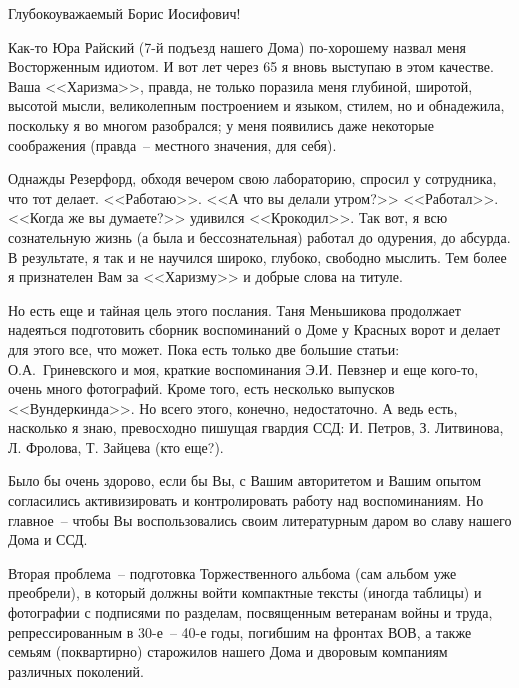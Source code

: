 \documentclass[utf8x, 12pt]{G7-32a} %
\begin{document}
\frontmatter %


\thispagestyle{empty} 

\begin{center}
    Глубокоуважаемый Борис Иосифович!
\end{center}

Как-то Юра Райский (7-й подъезд нашего Дома) по-хорошему назвал меня Восторженным идиотом. И вот лет через 65 я вновь выступаю в этом качестве. Ваша <<Харизма>>, правда, не только поразила меня глубиной, широтой, высотой мысли, великолепным построением и языком, стилем, но и обнадежила, поскольку я во многом разобрался; у меня появились даже некоторые соображения (правда~-- местного значения, для себя).

Однажды Резерфорд, обходя вечером свою лабораторию, спросил у сотрудника, что тот делает. <<Работаю>>. <<А что вы делали утром?>> <<Работал>>. <<Когда же вы думаете?>> удивился <<Крокодил>>. Так вот, я всю сознательную жизнь (а была и бессознательная) работал до одурения, до абсурда. В результате, я так и не научился широко, глубоко, свободно мыслить. Тем более я признателен Вам за <<Харизму>> и добрые слова на титуле.

Но есть еще и тайная цель этого послания. Таня Меньшикова продолжает надеяться подготовить сборник воспоминаний о Доме у Красных ворот и делает для этого все, что может. Пока есть только две большие статьи: О.А.~Гриневского и моя, краткие воспоминания Э.И. Певзнер и еще кого-то, очень много фотографий. Кроме того, есть несколько выпусков <<Вундеркинда>>. Но всего этого, конечно, недостаточно. А ведь есть, насколько я знаю, превосходно пишущая гвардия ССД: И. Петров, З. Литвинова, Л. Фролова, Т. Зайцева (кто еще?).

Было бы очень здорово, если бы Вы, с Вашим авторитетом и Вашим опытом согласились активизировать и контролировать работу над воспоминаниям. Но главное~-- чтобы Вы воспользовались своим литературным даром во славу нашего Дома и ССД.

Вторая проблема~-- подготовка Торжественного альбома (сам альбом уже преобрели), в который должны войти компактные тексты (иногда таблицы) и фотографии с подписями по разделам, посвященным ветеранам войны и труда, репрессированным в 30-е~-- 40-е годы, погибшим на фронтах ВОВ, а также семьям (поквартирно) старожилов нашего Дома и дворовым компаниям различных поколений.
\end{document}

